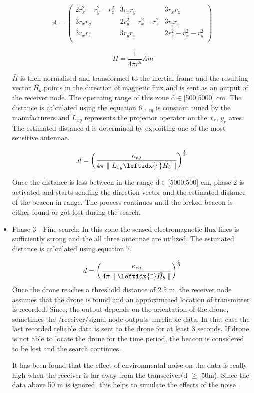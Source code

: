 \documentclass[conference]{IEEEtran}
\begin{document}
\begin{itemize}
\begin{gather}
 A
 =
\begin{pmatrix}
   2r_x^2-r_y^2-r_z^2  & 3r_x r_y & 3r_x r_z \\
   3r_x r_y  & 2r_y^2-r_x^2-r_z^2  & 3r_y r_z \\
   3r_x r_z  & 3r_y r_z & 2r_z^2-r_x^2-r_y^2  \\
   \end{pmatrix}
\end{gather}

\begin{equation}
\ \bar{H} =  \frac{1}{4 \pi r^5} A { \bar{m}} 
\end{equation}
 
 
$\bar{H}$ is then normalised and transformed to the inertial frame and the resulting vector $\bar{H_b}$ points in the direction of magnetic flux and is sent as an output of the receiver node. The operating range of this zone d$\in$[500,5000] cm. The distance is calculated using the equation 6 \cite{b3}. {\kappa$_{eq}$} is constant tuned by the manufacturers and $L_{xy}$ represents the projector operator on the $x_r$, $y_r$ axes. The estimated distance d is determined by exploiting one of the most sensitive antennae.

\begin{equation}
d =  \left(\frac{\kappa_{eq} }{4 \pi \parallel L_{xy} \leftidx{^r} \bar{H_b}\parallel}\right) ^{\frac{1}{3}}
\end{equation}

Once the distance is less between in the range d$\in$[5000,500] cm, phase 2 is activated and starts sending the direction vector and the estimated distance of the beacon in range. The process continues until the locked beacon is either found or got lost during the search.

\item Phase 3 - Fine search:  In this zone the sensed electromagnetic flux lines is sufficiently strong and the all three antennae are utilized. The estimated distance is calculated using equation 7.   \cite{b3}

\begin{equation}
d =  \left(\frac{\kappa_{eq} }{4 \pi \parallel\leftidx{^r}\bar{H_b}\parallel}\right) ^{\frac{1}{3}}
\end{equation}
Once the drone reaches a threshold distance of 2.5 m, the receiver node assumes that the drone is found and an approximated location of transmitter is recorded. Since, the output depends on the orientation of the drone, sometimes the /receiver/signal node outputs unreliable data. In that case the last recorded reliable data is sent to the drone for at least 3 seconds. If drone is not able to locate the drone for the time period, the beacon is considered to be lost and the search continues. 

It has been found that the effect of environmental noise on the data is really high when the receiver is far away from the transceiver(d $\ge$ 50m). Since the data above 50 m is ignored, this helps to simulate the effects of the noise \cite{b3}.

\end{itemize}
\end{document}
